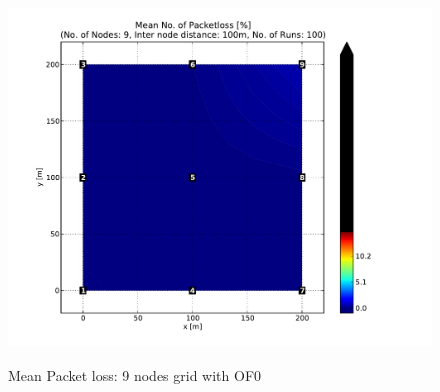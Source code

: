\begin{figure}[htbp]
{      \hspace{-30pt}
      \includegraphics[scale=0.23]{Pics/results/9/OF0/grid/dist100_montecarlo_contour_packetloss.pdf}}
  \caption{Mean Packet loss: 9 nodes grid with OF0}
 \label{fig:pl_9_grid_of0}
\end{figure}

